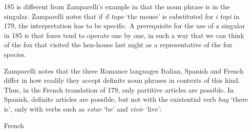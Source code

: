 \begin{styleBodyTextFirst}
185 is different from Zamparelli’s example in that the noun phrase is in the singular. Zamparelli notes that if \textit{il topo} ‘the mouse’ is substituted for \textit{i topi }in 179\textit{, }the interpretation has to be specific. A prerequisite for the use of a singular in 185 is that foxes tend to operate one by one, in such a way that we can think of the fox that visited the hen-house last night as a representative of the fox species. 

\end{styleBodyTextFirst}

\begin{styleBodytextC}
Zamparelli notes that the three Romance languages Italian, Spanish and French differ in how readily they accept definite noun phrases in contexts of this kind. Thus, in the French translation of 179, only partitive articles are possible. In Spanish, definite articles are possible, but not with the existential verb \textit{hay} ‘there is’, only with verbs such as \textit{estar} ‘be’ and \textit{vivir} ‘live’:

\end{styleBodytextC}

\begin{listWWNumileveli}
\item 

\begin{styleExample}
\label{bkm:Ref172696738}French

\end{styleExample}

\end{listWWNumileveli}

